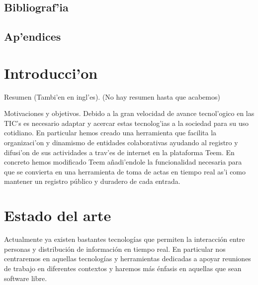 \documentclass{article}
\begin{document}
	\subsection{Bibliograf'ia}
	\subsection{Ap'endices}
\newpage
\section{Introducci'on}
Resumen (Tambi'en en ingl'es).
(No hay resumen hasta que acabemos)

Motivaciones y objetivos.
Debido a la gran velocidad de avance tecnol'ogico en las TIC's es necesario adaptar y acercar estas tecnolog'ias a la sociedad para su uso cotidiano. En particular hemos creado una herramienta que facilita la organizaci'on y dinamismo de entidades colaborativas ayudando al registro y difusi'on de sus actividades a trav'es de internet en la plataforma Teem. En concreto hemos modificado Teem añadi'endole la funcionalidad necesaria para que se convierta en una herramienta de toma de actas en tiempo real as'i como mantener un registro público y duradero de cada entrada.

\section{Estado del arte}
Actualmente ya existen bastantes tecnologías que permiten la interacción entre personas y distribución de información en tiempo real. En particular nos centraremos en aquellas tecnologías y herramientas dedicadas a apoyar reuniones de trabajo en diferentes contextos y haremos más énfasis en aquellas que sean software libre.
\end{document}
